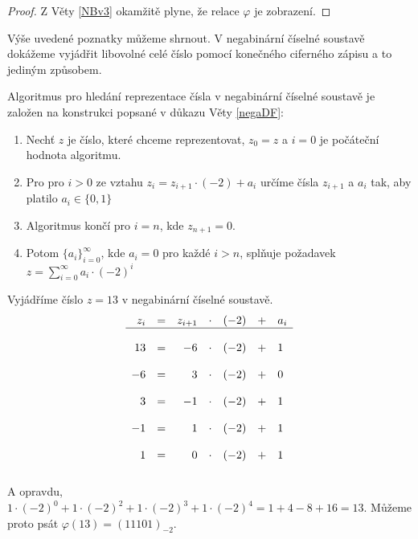 \documentclass[czech,bachelor,dept470,male]{diploma}
\newcommand{\posla}{\{a_i\}_{i=0}^{\infty}}
\begin{document}
\begin{proof}
	Z Věty \ref{NBv3} okamžitě plyne, že relace $\varphi$ je zobrazení.
\end{proof}
Výše uvedené poznatky můžeme shrnout. V negabinární číselné soustavě dokážeme vyjádřit libovolné celé číslo pomocí konečného ciferného zápisu a to jediným způsobem.
\begin{remark} Algoritmus pro hledání reprezentace čísla v negabinární číselné soustavě je založen na konstrukci popsané v důkazu Věty \ref{negaDF}:\newline
	\begin{enumerate}
		\item Nechť $z$ je číslo, které chceme reprezentovat, $z_0 = z$ a $i=0$ je počáteční hodnota algoritmu.
		\item Pro pro $i>0$ ze vztahu $z_i=z_{i+1}\cdot(-2)+a_i$ určíme čísla $z_{i+1}$ a $a_i$ tak, aby platilo
		      $a_i\in\{0,1\}$
		\item Algoritmus končí pro $i = n$, kde $z_{n+1} = 0$.
		\item Potom $\posla$, kde $a_i=0$ pro každé $i>n$, splňuje požadavek $z=
			      \sum_{i=0}^{\infty}a_i\cdot(-2)^i$
	\end{enumerate}
\end{remark}
\begin{example} Vyjádříme číslo $z = 13$ v negabinární číselné soustavě.
	$$
		\begin{array}{rcrclcl}
			z_i & = & z_{i+1} & \cdot & (-2) & + & a_i \\ \hline
			    &   &         &       &      &   &     \\
			13  & = & -6      & \cdot & (-2) & + & 1   \\
			    &   &         &       &      &   &     \\
			-6  & = & 3       & \cdot & (-2) & + & 0   \\
			    &   &         &       &      &   &     \\
			3   & = & -1      & \cdot & (-2) & + & 1   \\
			    &   &         &       &      &   &     \\
			-1  & = & 1       & \cdot & (-2) & + & 1   \\
			    &   &         &       &      &   &     \\
			1   & = & 0       & \cdot & (-2) & + & 1   \\
			    &   &         &       &      &   &     \\
		\end{array}
	$$
	A opravdu, $1\cdot(-2)^0 + 1 \cdot(-2)^2+1\cdot(-2)^3+1\cdot(-2)^4 = 1 + 4 - 8 + 16 = 13$. Můžeme proto psát $\varphi(13) = (11101)_{-2}$.
\end{example}
\end{document}
